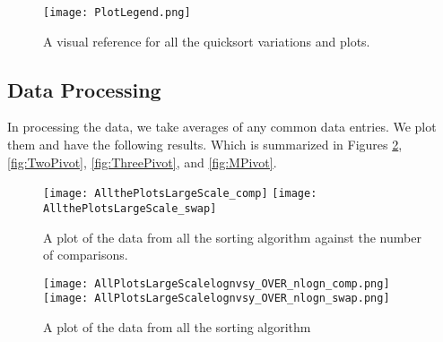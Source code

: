	\begin{figure}[ht!]
		\begin{center}   
			\texttt{[image: PlotLegend.png]}
			\label{fig:PlotLegend}
			\caption{A visual reference for all the quicksort variations and plots.}
		\end{center}
	\end{figure}

	\subsection{Data Processing}
		\label{subsec:DataProcessing}
		In processing the data, we take averages of any common data entries. We plot them and have the following results.
		Which is summarized in Figures \ref{fig:AllSorts}, \ref{fig:TwoPivot}, \ref{fig:ThreePivot}, and \ref{fig:MPivot}.

		\begin{figure}[ht!]
			\begin{center}
				\texttt{[image: AllthePlotsLargeScale\_comp]}
				\texttt{[image: AllthePlotsLargeScale\_swap]}
				\caption{A plot of the data from all the sorting algorithm against the number of comparisons.}
				\label{fig:AllSorts}
			\end{center}
		\end{figure}


		\begin{figure}[ht!]
			\begin{center}
				\texttt{[image: AllPlotsLargeScalelognvsy\_OVER\_nlogn\_comp.png]}
				\texttt{[image: AllPlotsLargeScalelognvsy\_OVER\_nlogn\_swap.png]}
				\caption{A plot of the data from all the sorting algorithm}
				\label{fig:AllSortsLog}
			\end{center}
		\end{figure}

